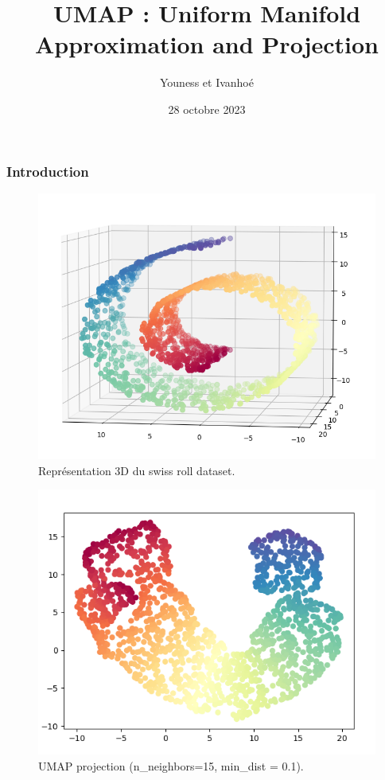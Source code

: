 \documentclass{beamer}
\title{UMAP : Uniform Manifold Approximation and Projection}
\author{Youness et Ivanhoé}
\date{28 octobre 2023}
\theoremstyle{definition}
\begin{document}
\begin{frame}[plain]
    \maketitle
\end{frame}


\begin{frame}
\frametitle{Introduction}

	\begin{minipage}[c]{1\linewidth}
	\begin{minipage}[t]{0.4\linewidth}\centering\begin{figure}
			\centering
			\includegraphics[scale=0.25]{swiss_roll.png}
			\caption{Représentation 3D du swiss roll dataset.}
	\end{figure}\end{minipage}\hfill 
	\begin{minipage}[t]{0.43\linewidth}\centering\begin{figure}
			\begin{center}
				\includegraphics[scale=0.27]{umap_swiss_roll.png}			
				\caption{UMAP projection (n\_neighbors=15, min\_dist = 0.1).}
			\end{center}
			

\end{figure}
\end{minipage}
\end{minipage}
\end{frame}
\end{document}
